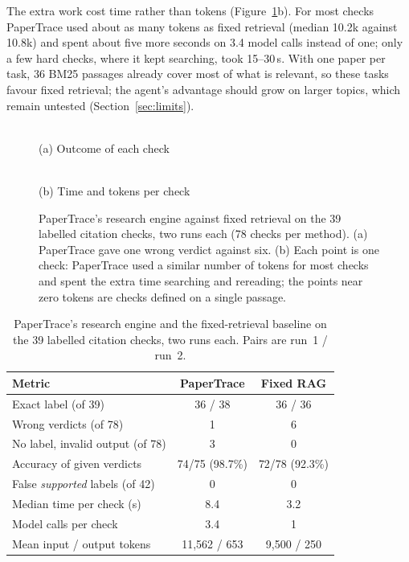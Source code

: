 \documentclass{article}
\begin{document}
The extra work cost time rather than tokens (Figure~\ref{fig:engine}b). For most checks PaperTrace
used about as many tokens as fixed retrieval (median 10.2k against 10.8k) and spent about five more
seconds on 3.4 model calls instead of one; only a few hard checks, where it kept searching, took
15--30\,s. With one paper per task, 36 BM25 passages already cover most of what is relevant, so these
tasks favour fixed retrieval; the agent's advantage should grow on larger topics, which remain
untested (Section~\ref{sec:limits}).

\begin{figure}[H]
  \centering
  \begin{minipage}[b]{0.47\linewidth}
    \centering
    \\[-2pt]
    {\small (a) Outcome of each check}
  \end{minipage}\hfill
  \begin{minipage}[b]{0.5\linewidth}
    \centering
    \\[-2pt]
    {\small (b) Time and tokens per check}
  \end{minipage}
  \caption{PaperTrace's research engine against fixed retrieval on the 39 labelled citation checks,
  two runs each (78 checks per method). (a) PaperTrace gave one wrong verdict against six. (b) Each
  point is one check: PaperTrace used a similar number of tokens for most checks and spent the extra
  time searching and rereading; the points near zero tokens are checks defined on a single passage.}
  \label{fig:engine}
\end{figure}

\begin{table}[H]
  \caption{PaperTrace's research engine and the fixed-retrieval baseline on the 39 labelled citation
  checks, two runs each. Pairs are run~1 / run~2.}
  \label{tab:baseline}
  \small\centering
  \begin{tabular}{@{}lcc@{}}\toprule
    Metric & PaperTrace & Fixed RAG \\ \midrule
    Exact label (of 39) & 36 / 38 & 36 / 36 \\
    Wrong verdicts (of 78) & 1 & 6 \\
    No label, invalid output (of 78) & 3 & 0 \\
    Accuracy of given verdicts & 74/75 (98.7\%) & 72/78 (92.3\%) \\
    False \emph{supported} labels (of 42) & 0 & 0 \\
    Median time per check (s) & 8.4 & 3.2 \\
    Model calls per check & 3.4 & 1 \\
    Mean input / output tokens & 11{,}562 / 653 & 9{,}500 / 250 \\
    \bottomrule
  \end{tabular}
\end{table}
\end{document}
